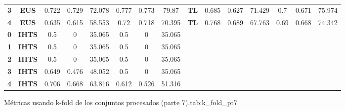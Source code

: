{{\begin{tabular}{c|c|cccccc|ccccccc}
\textbf{3} & \textbf{EUS} & 0.722 & 0.729 & 72.078 & 0.777 & 0.773 & 79.87 & \multicolumn{1}{c|}{\textbf{TL}} & 0.685 & 0.627 & 71.429 & 0.7   & 0.671 & 75.974 \\
\textbf{4} & \textbf{EUS} & 0.635 & 0.615 & 58.553 & 0.72  & 0.718 & 70.395 & \multicolumn{1}{c|}{\textbf{TL}} & 0.768 & 0.689 & 67.763 & 0.69  & 0.668 & 74.342 \\
\textbf{0} & \textbf{IHTS} & 0.5   & 0     & 35.065 & 0.5   & 0     & 35.065 &       &       &       &       &       &       &  \\
\textbf{1} & \textbf{IHTS} & 0.5   & 0     & 35.065 & 0.5   & 0     & 35.065 &       &       &       &       &       &       &  \\
\textbf{2} & \textbf{IHTS} & 0.5   & 0     & 35.065 & 0.5   & 0     & 35.065 &       &       &       &       &       &       &  \\
\textbf{3} & \textbf{IHTS} & 0.649 & 0.476 & 48.052 & 0.5   & 0     & 35.065 &       &       &       &       &       &       &  \\
\textbf{4} & \textbf{IHTS} & 0.706 & 0.668 & 63.816 & 0.612 & 0.526 & 51.316 &       &       &       &       &       &       &  \\
\end{tabular}}}{Métricas usando k-fold de los conjuntos procesados (parte 7).}{tab:k_fold_pt7}

